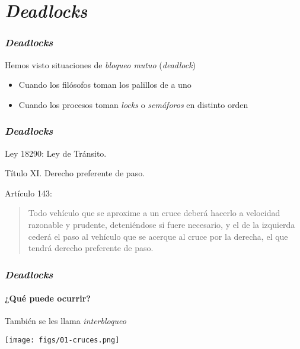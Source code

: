\documentclass[letter]{beamer}
\begin{document}
\section{{\em Deadlocks}}

\begin{frame}
  \frametitle{{\em Deadlocks}}

  Hemos visto situaciones de {\em bloqueo mutuo} ({\em deadlock})
  
  \begin{itemize}
    \item Cuando los filósofos toman los palillos de a uno
    \item Cuando los procesos toman {\em locks} o {\em semáforos} en distinto orden
  \end{itemize}
\end{frame}

\begin{frame}
  \frametitle{{\em Deadlocks}}

  Ley 18290: Ley de Tránsito.
  
  Título XI. Derecho preferente de paso.
  
  Artículo 143:
  \begin{quotation}
  Todo vehículo que se aproxime a un cruce deberá hacerlo a velocidad razonable y prudente, deteniéndose si fuere necesario, y el de la izquierda cederá el paso al vehículo que se acerque al cruce por la derecha, el que tendrá derecho preferente de paso.

  \end{quotation}

\end{frame}


\begin{frame}
  \frametitle{{\em Deadlocks}}
  \framesubtitle{¿Qué puede ocurrir?}

  También se les llama {\em interbloqueo}
  
  \begin{center}
    \texttt{[image: figs/01-cruces.png]}
  \end{center}

\end{frame}
\end{document}
